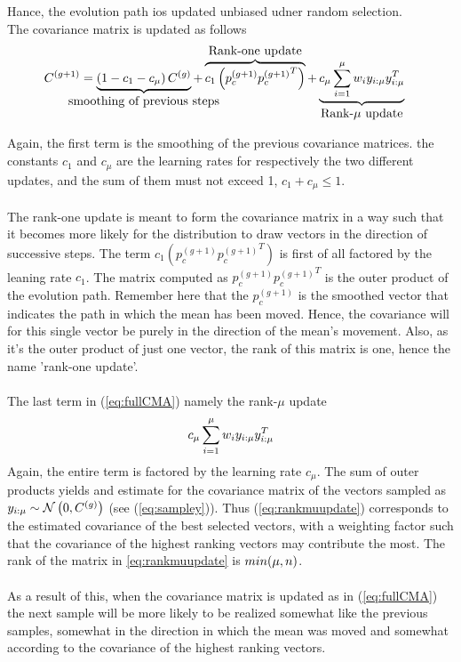 Hance, the evolution path ios updated unbiased udner random selection.
\\
The covariance matrix is updated as follows
\begin{align}
C^{(g+1)} &= 
\underbrace{\left( 1 - c_{1} - c_{\offspringNumber} \right)C^{(g)}}_{
\makebox[0pt]{\text{{smoothing of previous steps}}}
} + 
\overbrace{c_{1} \left( p_{c}^{(g+1)} {p_{c}^{(g+1)}}^{T}\right)}^{
\makebox[0pt]{\text{{Rank-one update}}}
} +
\underbrace{c_{\offspringNumber} \sum^{\offspringNumber}_{i = 1} w_{i} y_{i : \offspringNumber} y_{i : \offspringNumber} ^{T}}_{
\makebox[0pt]{\text{{Rank-$\mu$ update}}}
} \label{eq:fullCMA}
\end{align}

Again, the first term is the smoothing of the previous covariance matrices.
the constants $c_1$ and $c_\mu$ are the learning rates for respectively the two
different updates, and the sum of them must not exceed 1, $c_1 + c_\mu \leq 1$.\\
\\
The rank-one update is meant to form the covariance matrix in a way such that 
it becomes more likely for the distribution to draw vectors in the direction of
successive steps. The term $c_{1} \left( p_{c}^{(g+1)} {p_{c}^{(g+1)}}^{T}\right)$
is first of all factored by the leaning rate $c_1$. The matrix computed as 
$p_{c}^{(g+1)} {p_{c}^{(g+1)}}^{T}$ is the outer product of the evolution path. 
Remember here that the $p_{c}^{(g+1)}$ is the smoothed vector that indicates 
the path in which the mean has been moved. Hence, the covariance will for this 
single vector be purely in the direction of the mean's movement. Also, as it's 
the outer product of just one vector, the rank of this matrix is one, hence the
name 'rank-one update'.\\
\\
The last term in (\ref{eq:fullCMA}) namely the rank-$\mu$ update
\begin{align}
c_{\mu} \sum^{\mu}_{i = 1} w_{i} y_{i : \mu} y_{i : \mu} ^{T} \label{eq:rankmuupdate}
\end{align}
Again, the entire term is factored by the learning rate $c_\mu$. The sum
of outer products yields and estimate for the covariance matrix of the vectors
sampled as $y_{i : \mu} \sim \mathcal{N}\left(0, C^{(g)}\right)$ 
(see (\ref{eq:sampley})). Thus (\ref{eq:rankmuupdate}) corresponds to the 
estimated covariance of the best selected vectors, with a weighting factor
such that the covariance of the highest ranking vectors may contribute the most.
The rank of the matrix in \ref{eq:rankmuupdate} is $min(\mu, n)$.\\
\\
As a result of this, when the covariance matrix is updated as in (\ref{eq:fullCMA})
the next sample will be more likely to be realized somewhat like the previous 
samples, somewhat in the direction in which the mean was moved and somewhat 
according to the covariance of the highest ranking vectors.
\\



